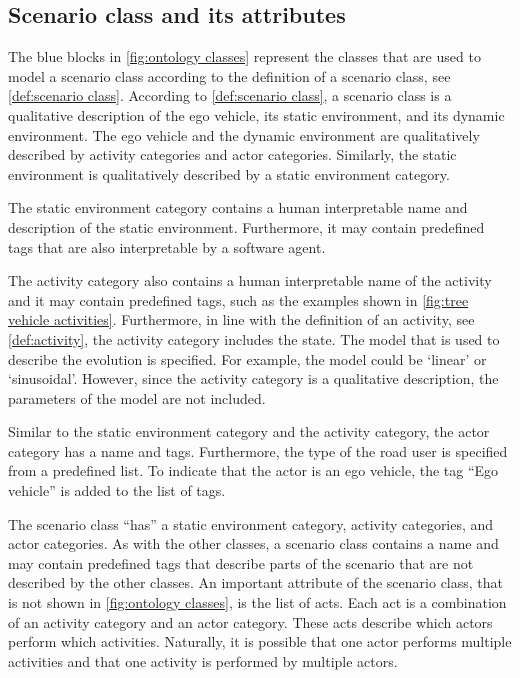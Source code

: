 \subsection{Scenario class and its attributes}
\label{sec:domain scenario class}

The blue blocks in \cref{fig:ontology classes} represent the classes that are used to model a scenario class according to the definition of a scenario class, see \cref{def:scenario class}. According to \cref{def:scenario class}, a scenario class is a qualitative description of the ego vehicle, its static environment, and its dynamic environment. The ego vehicle and the dynamic environment are qualitatively described by activity categories and actor categories. Similarly, the static environment is qualitatively described by a static environment category. 

The static environment category contains a human interpretable name and description of the static environment. Furthermore, it may contain predefined tags that are also interpretable by a software agent. 

The activity category also contains a human interpretable name of the activity and it may contain predefined tags, such as the examples shown in \cref{fig:tree vehicle activities}. Furthermore, in line with the definition of an activity, see \cref{def:activity}, the activity category includes the state.  The model that is used to describe the evolution is specified. For example, the model could be `linear' or `sinusoidal'. However, since the activity category is a qualitative description, the parameters of the model are not included.

Similar to the static environment category and the activity category, the actor category has a name and tags. Furthermore, the type of the road user is specified from a predefined list. To indicate that the actor is an ego vehicle, the tag ``Ego vehicle'' is added to the list of tags.

The scenario class ``has'' a static environment category, activity categories, and actor categories. As with the other classes, a scenario class contains a name and may contain predefined tags that describe parts of the scenario that are not described by the other classes. An important attribute of the scenario class, that is not shown in \cref{fig:ontology classes}, is the list of acts. Each act is a combination of an activity category and an actor category. These acts describe which actors perform which activities. Naturally, it is possible that one actor performs multiple activities and that one activity is performed by multiple actors.

